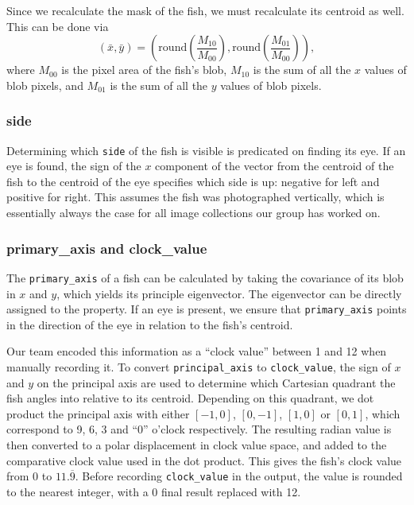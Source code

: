 \documentclass[conference]{IEEEtran}
\begin{document}
Since we recalculate the mask of the fish, we must recalculate its centroid as well. This can be done via
\begin{equation}
    (\bar{x}, \bar{y}) = (\mathrm{round}(\frac{M_{10}}{M_{00}}), \mathrm{round}(\frac{M_{01}}{M_{00}})),
\end{equation}
where \(M_{00}\) is the pixel area of the fish's blob, \(M_{10}\) is the sum of all the \(x\) values of blob pixels, and \(M_{01}\) is the sum of all the \(y\) values of blob pixels.
\subsubsection{side}
Determining which \verb|side| of the fish is visible is predicated on finding its eye. If an eye is found, the sign of the \(x\) component of the vector from the centroid of the fish to the centroid of the eye specifies which side is up: negative for left and positive for right. This assumes the fish was photographed vertically, which is essentially always the case for all image collections our group has worked on.
\subsubsection{primary\_axis and clock\_value}
The \verb|primary_axis| of a fish can be calculated by taking the covariance of its blob in \(x\) and \(y\), which yields its principle eigenvector.
The eigenvector can be directly assigned to the property. If an eye is
present, we ensure that \verb|primary_axis| points in the direction of the
eye in relation to the fish's centroid.

Our team encoded this information as a ``clock value'' between 1 and 12 when manually recording it. To convert \verb|principal_axis| to \verb|clock_value|, the sign of \(x\) and \(y\) on the principal axis are used to determine which Cartesian quadrant the fish angles into relative to its centroid. 
Depending on this quadrant, we dot product the principal axis with either \([-1,0]\), \([0,-1]\), \([1,0]\) or \([0,1]\), which correspond to 9, 6, 3 and ``0'' o'clock respectively. The resulting radian value is then converted to a polar displacement in clock value space, and added to the comparative clock value used in the dot product. This gives the fish's clock value from
0 to \(11.\overline{9}\). Before recording \verb|clock_value| in the output,
the value is rounded to the nearest integer, with a 0 final result replaced with 12.
\end{document}
